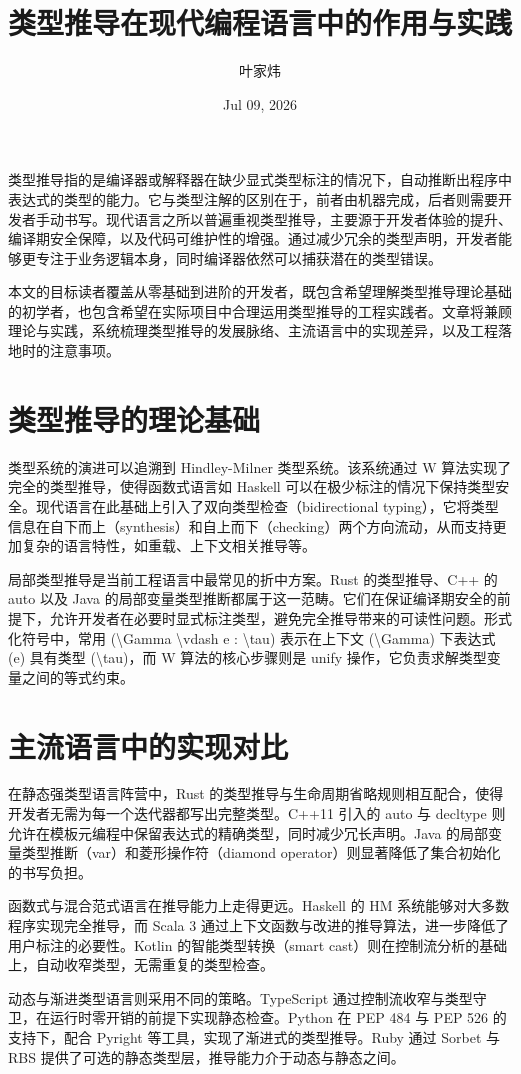 \title{类型推导在现代编程语言中的作用与实践}
\author{叶家炜}
\date{Jul 09, 2026}
\maketitle
类型推导指的是编译器或解释器在缺少显式类型标注的情况下，自动推断出程序中表达式的类型的能力。它与类型注解的区别在于，前者由机器完成，后者则需要开发者手动书写。现代语言之所以普遍重视类型推导，主要源于开发者体验的提升、编译期安全保障，以及代码可维护性的增强。通过减少冗余的类型声明，开发者能够更专注于业务逻辑本身，同时编译器依然可以捕获潜在的类型错误。\par
本文的目标读者覆盖从零基础到进阶的开发者，既包含希望理解类型推导理论基础的初学者，也包含希望在实际项目中合理运用类型推导的工程实践者。文章将兼顾理论与实践，系统梳理类型推导的发展脉络、主流语言中的实现差异，以及工程落地时的注意事项。\par
\chapter{类型推导的理论基础}
类型系统的演进可以追溯到 Hindley-Milner 类型系统。该系统通过 W 算法实现了完全的类型推导，使得函数式语言如 Haskell 可以在极少标注的情况下保持类型安全。现代语言在此基础上引入了双向类型检查（bidirectional typing），它将类型信息在自下而上（synthesis）和自上而下（checking）两个方向流动，从而支持更加复杂的语言特性，如重载、上下文相关推导等。\par
局部类型推导是当前工程语言中最常见的折中方案。Rust 的类型推导、C++ 的 auto 以及 Java 的局部变量类型推断都属于这一范畴。它们在保证编译期安全的前提下，允许开发者在必要时显式标注类型，避免完全推导带来的可读性问题。形式化符号中，常用 (\textbackslash{}Gamma \textbackslash{}vdash e : \textbackslash{}tau) 表示在上下文 (\textbackslash{}Gamma) 下表达式 (e) 具有类型 (\textbackslash{}tau)，而 W 算法的核心步骤则是 unify 操作，它负责求解类型变量之间的等式约束。\par
\chapter{主流语言中的实现对比}
在静态强类型语言阵营中，Rust 的类型推导与生命周期省略规则相互配合，使得开发者无需为每一个迭代器都写出完整类型。C++11 引入的 auto 与 decltype 则允许在模板元编程中保留表达式的精确类型，同时减少冗长声明。Java 的局部变量类型推断（var）和菱形操作符（diamond operator）则显著降低了集合初始化的书写负担。\par
函数式与混合范式语言在推导能力上走得更远。Haskell 的 HM 系统能够对大多数程序实现完全推导，而 Scala 3 通过上下文函数与改进的推导算法，进一步降低了用户标注的必要性。Kotlin 的智能类型转换（smart cast）则在控制流分析的基础上，自动收窄类型，无需重复的类型检查。\par
动态与渐进类型语言则采用不同的策略。TypeScript 通过控制流收窄与类型守卫，在运行时零开销的前提下实现静态检查。Python 在 PEP 484 与 PEP 526 的支持下，配合 Pyright 等工具，实现了渐进式的类型推导。Ruby 通过 Sorbet 与 RBS 提供了可选的静态类型层，推导能力介于动态与静态之间。\par
